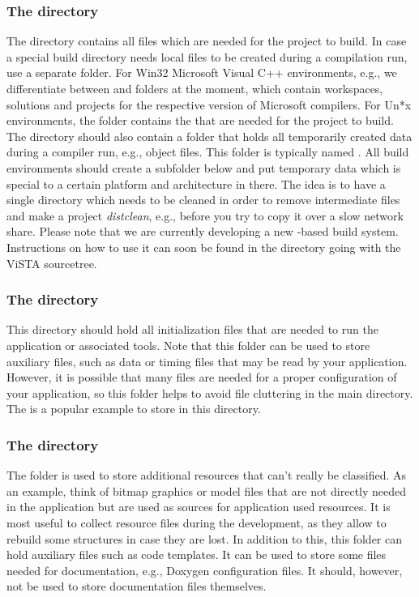 \subsubsection{The  directory}
The  directory contains all files which are needed for the project to build.
In case a special build directory needs local files to be created during a compilation run, use a separate folder.
For Win32 Microsoft Visual C++ environments, e.g., we differentiate between  and  folders at the moment, which contain workspaces, solutions and projects for the respective version of Microsoft compilers.
For Un*x environments, the folder contains the  that are needed for the project to build.
The  directory should also contain a folder that holds all temporarily created data during a compiler run, e.g., object files. 
This folder is typically named .
All build environments should create a subfolder below  and put temporary data which is special to a certain platform and architecture in there.
The idea is to have a single directory which needs to be cleaned in order to remove intermediate files and make a project \emph{distclean}, e.g., before you try to copy it over a slow network share.
Please note that we are currently developing a new -based build system.
Instructions on how to use it can soon be found in the  directory going with the ViSTA sourcetree.

\subsubsection{The  directory}
This directory should hold all initialization files that are needed to run the application or associated tools.
Note that this folder can be used to store auxiliary files, such as data or timing files that may be read by your application.
However, it is possible that many files are needed for a proper configuration of your application, so this folder helps to avoid file cluttering in the main directory.
The  is a popular example to store in this directory.

\subsubsection{The  directory}
The  folder is used to store additional resources that can't really be classified.
As an example, think of bitmap graphics or model files that are not directly needed in the application but are used as sources for application used resources.
It is most useful to collect resource files during the development, as they allow to rebuild some structures in case they are lost.
In addition to this, this folder can hold auxiliary files such as code templates.
It can be used to store some files needed for documentation, e.g., Doxygen configuration files.
It should, however, not be used to store documentation files themselves.

